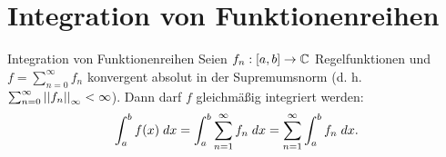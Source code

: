 \documentclass[main.tex]{subfiles}
\begin{document}
\section*{Integration von Funktionenreihen}

\begin{karte}{Integration von Funktionenreihen}
    Seien \( \abb{f_n}{[a,b]}{\C} \) Regelfunktionen 
    und \( f = \sum_{n=0}^\infty f_n \) konvergent 
    absolut in der Supremumsnorm 
    (d. h. \( \sum_{n=0}^\infty \norm{f_n}_\infty < \infty \)). 
    Dann darf \(f\) gleichmäßig integriert werden:
    \[ \integral{f(x)}{a}{b} 
    = \integral{\sum_{n=1}^\infty f_n}{a}{b}
    = \sum_{n=1}^\infty \integral{f_n}{a}{b}. \]
\end{karte}
\end{document}
